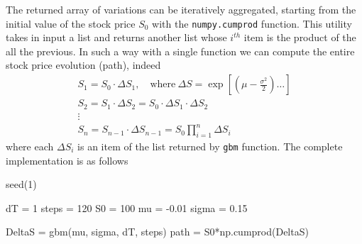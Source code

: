 \documentclass[]{article}
\begin{document}
	The returned array of variations can be iteratively aggregated, starting from the initial value of the stock price $S_0$ with the \texttt{numpy.cumprod} function. This utility takes in input a list and returns another list whose $i^{th}$ item is the product of the all the previous. In such a way with a single function we can compute the entire stock price evolution (path), indeed
	\begin{gather*}
		S_1 = S_0\cdot \Delta S_1,\quad\mathrm{where}~\Delta S = \exp\left[\left(\mu -\frac{\sigma^2}{2}\right)\ldots\right]\\
		S_2 = S_1\cdot \Delta S_2 = S_0\cdot \Delta S_1 \cdot \Delta S_2\\
		\vdots\\
		S_n = S_{n-1}\cdot \Delta S_{n-1} = S_0 \prod_{i=1}^{n}\Delta S_i
	\end{gather*}  
	where each $\Delta S_i$ is an item of the list returned by \texttt{gbm} function.
	\newpage
	The complete implementation is as follows
\begin{ipython} 
seed(1)

dT = 1
steps = 120
S0 = 100
mu = -0.01
sigma = 0.15

DeltaS = gbm(mu, sigma, dT, steps)
path = S0*np.cumprod(DeltaS)
\end{ipython}
\end{document}
